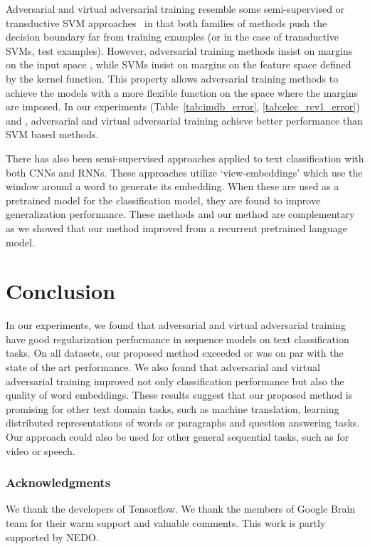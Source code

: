 \documentclass{article}
\begin{document}
Adversarial and virtual adversarial training resemble some semi-supervised or transductive SVM approaches~\cite[]{joachims1999transductive, chapelle2005semi, collobert2006large, 
belkin2006manifold} in that both families of methods push the decision
boundary far from training examples (or in the case of transductive SVMs,
test examples).
However, adversarial training methods insist on margins on the input space , while SVMs insist on margins on the feature space defined by the kernel function.      
This property allows adversarial training methods to achieve the models with a more flexible function on the space where the margins are imposed. 
In our experiments (Table~\ref{tab:imdb_error}, \ref{tab:elec_rcv1_error}) and \cite{miyato2015distributional}, 
adversarial and virtual adversarial training achieve better performance than SVM based methods.

There has also been semi-supervised approaches applied to text classification
with both CNNs and RNNs. These approaches utilize
`view-embeddings'\cite[]{johnson2015semi,johnson2016supervised} which
use the window around a word to generate its embedding.
When these are used as a pretrained model for the classification model, they are found to
improve generalization performance.
These methods and our method are complementary as we showed that our
method improved from a recurrent pretrained language model.

\section{Conclusion}
In our experiments, we found that adversarial and virtual adversarial training
have good regularization performance in sequence models on text classification tasks. On all
datasets, our proposed method exceeded or was on par with the state of the art performance.
We also found that adversarial and virtual adversarial training improved not
only classification performance but also the quality of word embeddings.
These results suggest that our proposed method is promising for other text domain
tasks, such as machine translation\cite[]{sutskever2014sequence}, learning distributed representations of
words or paragraphs\cite[]{mikolov2013distributed, le2014distributed} and question
answering tasks. Our approach could also be used for other general sequential tasks, such as
for video or speech.

\subsubsection*{Acknowledgments}
We thank the developers of Tensorflow. We thank the members of Google Brain team for their warm support and valuable comments.   
This work is partly supported by NEDO. 




\end{document}
